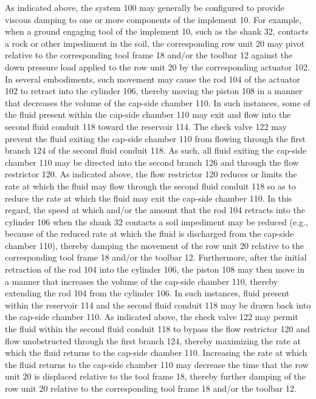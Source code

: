 \documentclass[11pt,a4paper]{article}
\begin{document}
As indicated above, the system 100 may generally be configured to provide viscous damping to one or more components of the implement 10. For example, when a ground engaging tool of the implement 10, such as the shank 32, contacts a rock or other impediment in the soil, the corresponding row unit 20 may pivot relative to the corresponding tool frame 18 and/or the toolbar 12 against the down pressure load applied to the row unit 20 by the corresponding actuator 102. In several embodiments, such movement may cause the rod 104 of the actuator 102 to retract into the cylinder 106, thereby moving the piston 108 in a manner that decreases the volume of the cap-side chamber 110. In such instances, some of the fluid present within the cap-side chamber 110 may exit and flow into the second fluid conduit 118 toward the reservoir 114. The check valve 122 may prevent the fluid exiting the cap-side chamber 110 from flowing through the first branch 124 of the second fluid conduit 118. As such, all fluid exiting the cap-side chamber 110 may be directed into the second branch 126 and through the flow restrictor 120. As indicated above, the flow restrictor 120 reduces or limits the rate at which the fluid may flow through the second fluid conduit 118 so as to reduce the rate at which the fluid may exit the cap-side chamber 110. In this regard, the speed at which and/or the amount that the rod 104 retracts into the cylinder 106 when the shank 32 contacts a soil impediment may be reduced (e.g., because of the reduced rate at which the fluid is discharged from the cap-side chamber 110), thereby damping the movement of the row unit 20 relative to the corresponding tool frame 18 and/or the toolbar 12. Furthermore, after the initial retraction of the rod 104 into the cylinder 106, the piston 108 may then move in a manner that increases the volume of the cap-side chamber 110, thereby extending the rod 104 from the cylinder 106. In such instances, fluid present within the reservoir 114 and the second fluid conduit 118 may be drawn back into the cap-side chamber 110. As indicated above, the check valve 122 may permit the fluid within the second fluid conduit 118 to bypass the flow restrictor 120 and flow unobstructed through the first branch 124, thereby maximizing the rate at which the fluid returns to the cap-side chamber 110. Increasing the rate at which the fluid returns to the cap-side chamber 110 may decrease the time that the row unit 20 is displaced relative to the tool frame 18, thereby further damping of the row unit 20 relative to the corresponding tool frame 18 and/or the toolbar 12.
\end{document}
